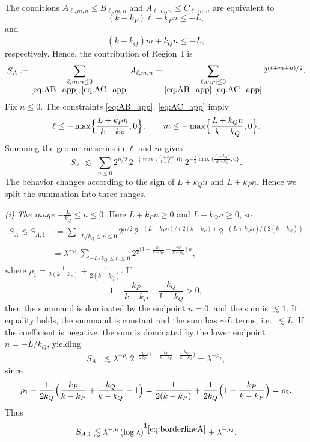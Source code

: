 \documentclass[10pt]{amsart}
\numberwithin{equation}{section}
\theoremstyle{definition}
\theoremstyle{remark}
\theoremstyle{remark}
\begin{document}
	The conditions $A_{\ell,m,n}\le B_{\ell,m,n}$ and $A_{\ell,m,n}\le C_{\ell,m,n}$ are equivalent to
	\begin{equation}\label{eq:AB_app}
		(k-k_P)\ell+k_P n\le -L,
	\end{equation}
	and
	\begin{equation}\label{eq:AC_app}
		(k-k_Q)m+k_Q n\le -L,
	\end{equation}
	respectively. Hence, the contribution of Region~I is
	\[
	S_A:=\sum_{\substack{\ell,m,n\le0\\ \eqref{eq:AB_app},\,\eqref{eq:AC_app}}}A_{\ell,m,n}
	=\sum_{\substack{\ell,m,n\le0\\ \eqref{eq:AB_app},\,\eqref{eq:AC_app}}}2^{(\ell+m+n)/2}.
	\]
	Fix $n\le 0$. The constraints \eqref{eq:AB_app}, \eqref{eq:AC_app} imply
	\[
	\ell\le -\max\Bigl\{\frac{L+k_P n}{k-k_P},0\Bigr\},\qquad
	m\le -\max\Bigl\{\frac{L+k_Q n}{k-k_Q},0\Bigr\}.
	\]
	Summing the geometric series in $\ell$ and $m$ gives
	\[
	S_A\;\lesssim\;\sum_{n\le 0}2^{n/2}\,
	2^{-\frac12\max\{\frac{L+k_P n}{k-k_P},0\}}\,
	2^{-\frac12\max\{\frac{L+k_Q n}{k-k_Q},0\}}.
	\]
    The behavior changes according to the sign of
$L+k_Qn$
and
$L+k_Pn$.
Hence we split the summation into three ranges.


	
	\smallskip
	\noindent\emph{(i) The range $-\frac{L}{k_Q}\le n\le 0$.}
	Here $L+k_P n\ge 0$ and $L+k_Q n\ge 0$, so
	\begin{align*}
		S_A\lesssim S_{A,1}
		&:=\sum_{-L/k_Q\le n\le 0}
		2^{n/2}\,2^{-(L+k_P n)/(2(k-k_P))}\,2^{-(L+k_Q n)/(2(k-k_Q))}\\
		&=\lambda^{-\rho_1}\sum_{-L/k_Q\le n\le 0}
		2^{\frac12\bigl(1-\frac{k_P}{k-k_P}-\frac{k_Q}{k-k_Q}\bigr)\,n},
	\end{align*}
	where $\rho_1=\frac1{2(k-k_P)}+\frac1{2(k-k_Q)}$.
	If
	\[
	1-\frac{k_P}{k-k_P}-\frac{k_Q}{k-k_Q}>0,
	\]
	then the summand is dominated by the endpoint \(n=0\), and the sum is $\lesssim 1$.
	If equality holds, the summand is constant and the sum has $\sim L$ terms, i.e.\ $\lesssim L$.
	If the coefficient is negative, the sum is dominated by the lower endpoint $n=-L/k_Q$, yielding
	\[
	S_{A,1}\lesssim \lambda^{-\rho_1}\,
	2^{-\frac{L}{2k_Q}\bigl(1-\frac{k_P}{k-k_P}-\frac{k_Q}{k-k_Q}\bigr)}
	=\lambda^{-\rho_2},
	\]
	since
	\[
	\rho_1-\frac1{2k_Q}\Bigl(\frac{k_P}{k-k_P}+\frac{k_Q}{k-k_Q}-1\Bigr)
	=
	\frac1{2(k-k_P)}+\frac1{2k_Q}\Bigl(1-\frac{k_P}{k-k_P}\Bigr)
	=\rho_2.
	\]
	Thus
	\begin{equation}\label{eq:SA1_bound}
		S_{A,1}\lesssim
		\lambda^{-\rho_1}(\log\lambda)^{\mathbf 1_{\eqref{eq:borderlineA}}}
		+\lambda^{-\rho_2}.
	\end{equation}
	
\end{document}

